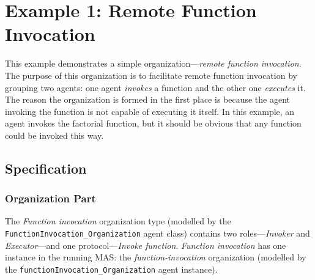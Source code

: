 
\section{Example 1: Remote Function Invocation}

This example demonstrates a simple organization---\textit{remote function invocation}.
The purpose of this organization is to facilitate remote function invocation by grouping two agents: one agent \textit{invokes} a function and the other one \textit{executes} it.
The reason the organization is formed in the first place is because the agent invoking the function is not capable of executing it itself.
In this example, an agent invokes the factorial function, but it should be obvious that any function could be invoked this way.

\subsection*{Specification}

\subsubsection*{Organization Part}

The \textit{Function invocation} organization type (modelled by the \texttt{FunctionInvocation\_Organization} agent class) contains two roles---\textit{Invoker} and \textit{Executor}---and one protocol---\textit{Invoke function}.
\textit{Function invocation} has one instance in the running MAS: the \textit{function-invocation} organization (modelled by the \texttt{functionInvocation\_Organization} agent instance).

